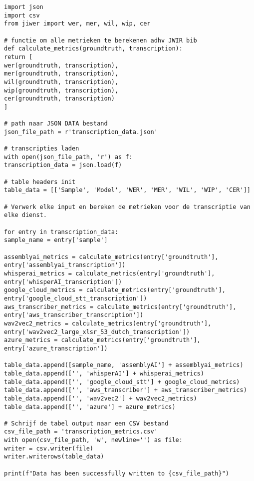 \pagebreak
\begin{lstlisting}[caption={Evaluatie code}, label={lst:evaluatie_code}]
import json
import csv
from jiwer import wer, mer, wil, wip, cer

# functie om alle metrieken te berekenen adhv JWIR bib
def calculate_metrics(groundtruth, transcription):
return [
wer(groundtruth, transcription),
mer(groundtruth, transcription),
wil(groundtruth, transcription),
wip(groundtruth, transcription),
cer(groundtruth, transcription)
]

# path naar JSON DATA bestand
json_file_path = r'transcription_data.json'

# transcripties laden
with open(json_file_path, 'r') as f:
transcription_data = json.load(f)

# table headers init
table_data = [['Sample', 'Model', 'WER', 'MER', 'WIL', 'WIP', 'CER']]

# Verwerk elke input en bereken de metrieken voor de transcriptie van elke dienst.

for entry in transcription_data:
sample_name = entry['sample']

assemblyai_metrics = calculate_metrics(entry['groundtruth'], entry['assemblyai_transcription'])
whisperai_metrics = calculate_metrics(entry['groundtruth'], entry['whisperAI_transcription'])
google_cloud_metrics = calculate_metrics(entry['groundtruth'], entry['google_cloud_stt_transcription'])
aws_transcriber_metrics = calculate_metrics(entry['groundtruth'], entry['aws_transcriber_transcription'])
wav2vec2_metrics = calculate_metrics(entry['groundtruth'], entry['wav2vec2_large_xlsr_53_dutch_transcription'])
azure_metrics = calculate_metrics(entry['groundtruth'], entry['azure_transcription'])

table_data.append([sample_name, 'assemblyAI'] + assemblyai_metrics)
table_data.append(['', 'whisperAI'] + whisperai_metrics)
table_data.append(['', 'google_cloud_stt'] + google_cloud_metrics)
table_data.append(['', 'aws_transcriber'] + aws_transcriber_metrics)
table_data.append(['', 'wav2vec2'] + wav2vec2_metrics)
table_data.append(['', 'azure'] + azure_metrics)

# Schrijf de tabel output naar een CSV bestand
csv_file_path = 'transcription_metrics.csv'
with open(csv_file_path, 'w', newline='') as file:
writer = csv.writer(file)
writer.writerows(table_data)

print(f"Data has been successfully written to {csv_file_path}")

\end{lstlisting}
